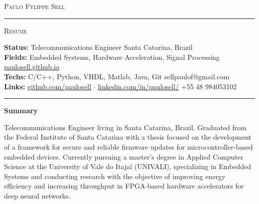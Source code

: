 \documentclass[10pt,A4]{article}
\newcommand{\sectionspace}{
	\vspace{0.1cm}
}
\newcommand{\cvsection}[1]
{
	\begin{center}
		\large\textcolor{sectcol}{\textbf{#1}}
	\end{center}
	\sectionspace
}
\newcommand{\metasection}[2]
{
\footnotesize{#2} \hspace*{\fill} \footnotesize{#1}\\[1pt]
}
\begin{document}
\pagestyle{fancy}	








\vspace{-8pt}
\begin{center}
	\HUGE \textsc{Paulo Fylippe Sell} \textcolor{sectcol}{\rule[-1mm]{1mm}{0.9cm}} \textsc{Resume}\\[2pt]
	
\end{center}



\vspace{6pt}


\metasection{Santa Catarina, Brazil}{\textbf{Status:} Telecommunications Engineer}
\metasection{\href{https://paulosell.github.io}{paulosell.github.io}}{\textbf{Fields:} Embedded Systems, Hardware Acceleration, Signal Processing}
\metasection{sellpaulof@gmail.com}{\textbf{Techs:} C/C++, Python, VHDL, Matlab, Java, Git}
\metasection{+55 48 984053102}{\textbf{Links:} \href{https://github.com/paulosell}{github.com/paulosell} $\cdot$ \href{https://www.linkedin.com/in/paulosell/}{linkedin.com/in/paulosell/}} 
\vspace{-2pt}
\textcolor{softcol}{\hrule}
\vspace{6pt}

\normalsize

\vspace{-6pt}
\cvsection{Summary}
Telecommunications Engineer living in Santa Catarina, Brazil. Graduated from the Federal Institute of Santa Catarina with a thesis focused on the development of a framework for secure and reliable firmware updates for microcontroller-based embedded devices. Currently pursuing a master's degree in Applied Computer Science at the University of Vale do Itajaí (UNIVALI), specializing in Embedded Systems and conducting research with the objective of improving energy efficiency and increasing throughput in FPGA-based hardware accelerators for deep neural networks.\\
\end{document}
